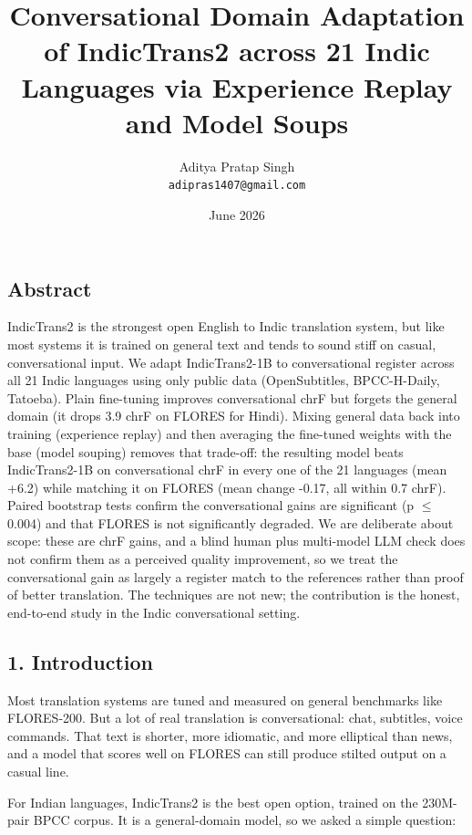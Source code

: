 \documentclass[
  11pt,
]{article}
\title{Conversational Domain Adaptation of IndicTrans2 across 21 Indic
Languages via Experience Replay and Model Soups}
\author{Aditya Pratap Singh\\ \texttt{adipras1407@gmail.com}}
\date{June 2026}
\begin{document}
\maketitle

\hypertarget{abstract}{%
\subsection{Abstract}\label{abstract}}

IndicTrans2 is the strongest open English to Indic translation system,
but like most systems it is trained on general text and tends to sound
stiff on casual, conversational input. We adapt IndicTrans2-1B to
conversational register across all 21 Indic languages using only public
data (OpenSubtitles, BPCC-H-Daily, Tatoeba). Plain fine-tuning improves
conversational chrF but forgets the general domain (it drops 3.9 chrF on
FLORES for Hindi). Mixing general data back into training (experience
replay) and then averaging the fine-tuned weights with the base (model
souping) removes that trade-off: the resulting model beats
IndicTrans2-1B on conversational chrF in every one of the 21 languages
(mean +6.2) while matching it on FLORES (mean change -0.17, all within
0.7 chrF). Paired bootstrap tests confirm the conversational gains are
significant (p $\le$ 0.004) and that FLORES is not significantly degraded.
We are deliberate about scope: these are chrF gains, and a blind human
plus multi-model LLM check does not confirm them as a perceived quality
improvement, so we treat the conversational gain as largely a register
match to the references rather than proof of better translation. The
techniques are not new; the contribution is the honest, end-to-end study
in the Indic conversational setting.

\hypertarget{introduction}{%
\subsection{1. Introduction}\label{introduction}}

Most translation systems are tuned and measured on general benchmarks
like FLORES-200. But a lot of real translation is conversational: chat,
subtitles, voice commands. That text is shorter, more idiomatic, and
more elliptical than news, and a model that scores well on FLORES can
still produce stilted output on a casual line.

For Indian languages, IndicTrans2 is the best open option, trained on
the 230M-pair BPCC corpus. It is a general-domain model, so we asked a
simple question:
\end{document}
